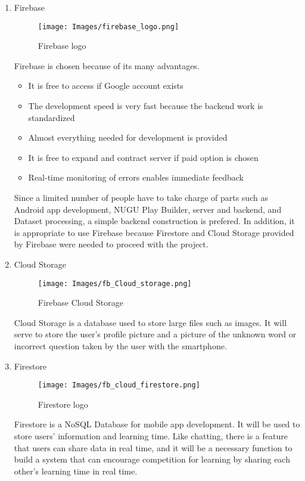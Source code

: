 \documentclass[conference]{IEEEtran}
\begin{document}
\begin{enumerate}
\item Firebase

\begin{figure}[H]
    \centering
    \texttt{[image: Images/firebase\_logo.png]}
    \caption{Firebase logo}
\end{figure}

Firebase is chosen because of its many advantages.
\begin{itemize}
\item It is free to access if Google account exists
\item The development speed is very fast because the backend work is standardized
\item Almost everything needed for development is provided
\item It is free to expand and contract server if paid option is chosen
\item Real-time monitoring of errors enables immediate feedback
\end{itemize}

Since a limited number of people have to take charge of parts such as Android app development, NUGU Play Builder, server and backend, and Dataset processing, a simple backend construction is prefered. In addition, it is appropriate to use Firebase because Firestore and Cloud Storage provided by Firebase were needed to proceed with the project.\\


\item Cloud Storage

\begin{figure}[H]
    \centering
    \texttt{[image: Images/fb\_Cloud\_storage.png]}
    \caption{Firebase Cloud Storage}
\end{figure}

Cloud Storage is a database used to store large files such as images. It will serve to store the user's profile picture and a picture of the unknown word or incorrect question taken by the user with the smartphone.\\

\item Firestore

\begin{figure}[H]
    \centering
    \texttt{[image: Images/fb\_cloud\_firestore.png]}
    \caption{Firestore logo}
\end{figure}

Firestore is a NoSQL Database for mobile app development. It will be used to store users' information and learning time. Like chatting, there is a feature that users can share data in real time, and it will be a necessary function to build a system that can encourage competition for learning by sharing each other's learning time in real time.

\end{enumerate}
\end{document}
